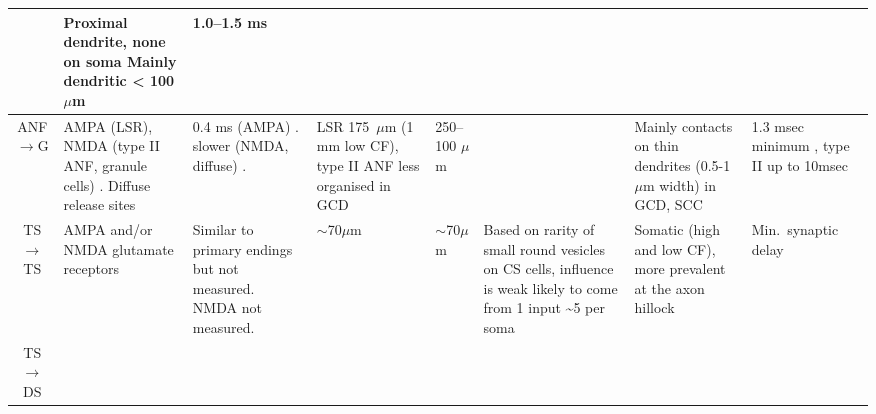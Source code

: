 \begin{longtable}{cYYYYYYY}
                                & %
Proximal dendrite, none on soma \citep[rat][]{RubioJuiz:2004}  
Mainly dendritic {\textless} 100$\mu$m \citep{Alibardi:1999,Liberman:1993,SpirouDavisEtAl:1999}
                                & %
1.0--1.5 ms \citep{ZhangOertel:1993,Rhode:1999,SpirouDavisEtAl:1999}
\\ \midrule
ANF\ensuremath{\rightarrow}G                      
                                & %
AMPA (LSR), NMDA (type II ANF, granule cells)
\citep{Cant:1992,FerragamoGoldingEtAl:1998a,RyugoWrightEtAl:1993,Ryugo:1992,RyugoParks:2003}.
Diffuse release sites \citep{HurdHutsonEtAl:1999}             
                                & %
0.4 ms (AMPA)   \citep{GardnerTrussellEtAl:1999}. 
slower (NMDA, diffuse) \citep{HurdHutsonEtAl:1999}.    
                                & %
LSR 175~$\mu$m (1 mm low CF)\citep{Ryugo:2008}, type II ANF less organised in GCD \citep{WeedmanPongstapornEtAl:1996,RyugoWrigthEtAl:1993}
                                & %
250--100 $\mu$m \citep{FerragamoGoldingEtAl:1998a}                     
                                & 
                                & %
Mainly contacts on thin dendrites (0.5-1 $\mu$m width) in GCD, SCC 
\citep{BensonBrown:2004,FerragamoGoldingEtAl:1998}                
                                & %
1.3 msec minimum \citep{FerragamoGoldingEtAl:1998a}, 
type II up to 10msec \citep[theoretical][]{Brown:1993}
\\ \midrule
TS\ensuremath{\rightarrow}TS                        
                                & %
AMPA and/or NMDA glutamate receptors \citep{FerragamoGoldingEtAl:1998a}        
                                & %
Similar to primary endings but not measured.  
NMDA not measured.           
                                & 
$\sim$70$\mu$m \citep[cat][]{SmithRhode:1989} 
                                & %
$\sim$70$\mu$m \citep[cat][]{SmithRhode:1989} 
                                & %
Based on rarity of small round vesicles on CS cells, influence is weak \citep{SmithRhode:1989} 
likely to come from 1 input \citep{FerragamoGoldingEtAl:1998a}                     
\~{}5 per soma  \citep[chinchilla][]{JosephsonMorest:1998}
                                & %
Somatic (high and low CF), more prevalent at the axon hillock   \citep[chinchilla][]{JosephsonMorest:1998}
                                & %
Min.\ synaptic delay 
\\ \midrule
TS\ensuremath{\rightarrow}DS                        

\end{longtable}
